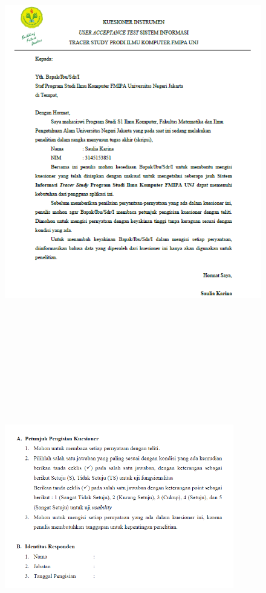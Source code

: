 \begin{figure}[H]
	\centering
	\includegraphics[width=15cm,height=18cm]{gambar/UAT/surat kuesioner}
	\label{surat_kuesioner}
\end{figure}

\begin{figure}[H]
	\centering
	\includegraphics[width=10cm,height=12cm]{gambar/UAT/surat kuesioner 2}
	\label{surat_kuesioner2}
\end{figure}

